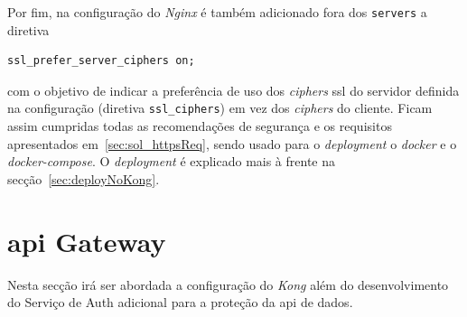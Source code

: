 Por fim, na configuração do \textit{Nginx} é também adicionado fora dos \texttt{servers} a diretiva 
\begin{verbatim}
ssl_prefer_server_ciphers on;
\end{verbatim}
com o objetivo de indicar a preferência de uso dos \textit{ciphers} \acrshort{ssl} do servidor definida na configuração (diretiva \texttt{ssl\_ciphers}) em vez dos \textit{ciphers} do cliente. Ficam assim cumpridas todas as recomendações de segurança e os requisitos apresentados em~\ref{sec:sol_httpsReq}, sendo usado para o \textit{deployment} o \textit{docker} e o \textit{docker-compose}. O \textit{deployment} é explicado mais à frente na secção~\ref{sec:deployNoKong}.

\section{\acrshort{api} Gateway}

Nesta secção irá ser abordada a configuração do \textit{Kong} além do desenvolvimento do Serviço de Auth adicional para a proteção da \acrshort{api} de dados.

